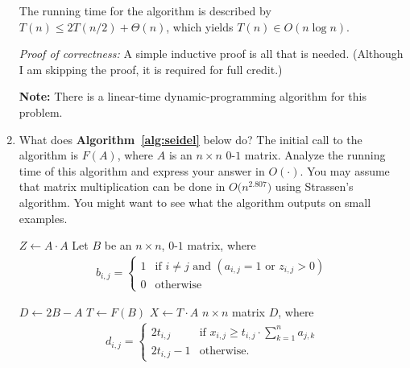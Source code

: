 \documentclass[11pt]{article}
\begin{document}
\begin{enumerate}
The running time for the algorithm is described by $T(n) \le 2T(n/2) + \Theta(n)$, which yields $T(n) \in O(n\log n)$.



	\emph{Proof of correctness:} A simple inductive proof is all that is needed. (Although I am skipping the proof, it is required for full credit.)


\textbf{Note:} There is a linear-time dynamic-programming algorithm for this problem.


 
\item What does \textbf{Algorithm~\ref{alg:seidel}} below do? The initial call to the algorithm is $F(A)$, where $A$ is an $n \times n$ $0$-$1$ matrix. Analyze the running time of this algorithm and express your answer in $O(\cdot)$. You may assume that matrix multiplication can be done in $O\bigl(n^{2.807}\bigr)$ using Strassen's algorithm. You might want to see what the algorithm outputs on small examples.
\begin{algorithm}[ht]      
      \begin{algorithmic}
\STATE $Z \leftarrow A \cdot A$
\STATE Let $B$ be an $n \times n$, $0$-$1$ matrix, where
\begin{align*}
  b_{i,j} = \begin{cases} 1 & \text{if } i \neq j \text{ and } (a_{i,j} = 1 \text{ or } z_{i,j} > 0)\\ 
    0 & \text{otherwise}
\end{cases}
\end{align*}

\RETURN $D \leftarrow 2B - A$
\ENDIF
\STATE $T \leftarrow F(B)$
\STATE $X \leftarrow T \cdot A$
\RETURN $n \times n$ matrix $D$, where 
\begin{align*}
  d_{i,j} =
  \begin{cases}
     2t_{i,j}& \text{if } x_{i,j} \geq t_{i,j}\cdot \sum_{k=1}^{n}a_{j,k}\\
     2t_{i,j}-1 & \text{otherwise}.
  \end{cases}
\end{align*}
      \end{algorithmic}
      \caption{$F(A)$}
      \label{alg:seidel}
  \end{algorithm}


\end{enumerate}
\end{document}
